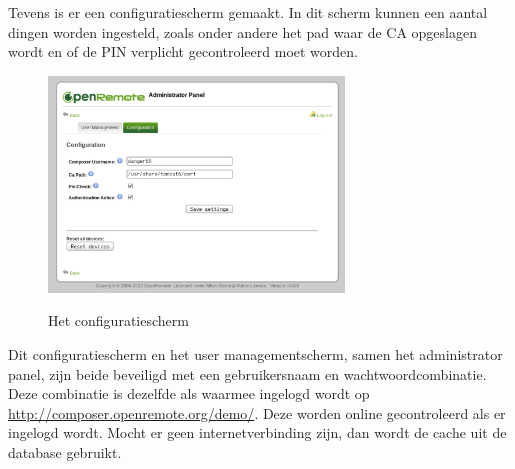\documentclass[]{article}
\begin{document}
Tevens is er een configuratiescherm gemaakt. In dit scherm kunnen een aantal dingen worden
ingesteld, zoals onder andere het pad waar de CA opgeslagen wordt en of de PIN
verplicht gecontroleerd moet worden.

\begin{figure}[h!]
  \centering
    \includegraphics[width=0.7\textwidth,keepaspectratio]{adminv2config.pdf}
  \label{adminv2config}
  \caption{Het configuratiescherm}
\end{figure}

Dit configuratiescherm en het user managementscherm, samen het administrator
panel, zijn beide beveiligd met
een gebruikersnaam en wachtwoordcombinatie. Deze combinatie is dezelfde als
waarmee ingelogd wordt op \url{http://composer.openremote.org/demo/}. 
Deze worden online gecontroleerd als er ingelogd wordt. Mocht er geen
internetverbinding zijn, dan wordt de cache uit de database gebruikt.
\end{document}
